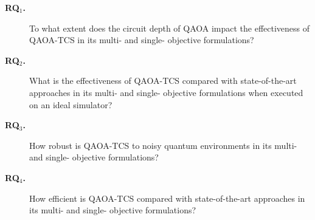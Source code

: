 \begin{description}
    \item[\textbf{RQ$_1$.}] To what extent does the circuit depth of QAOA impact the effectiveness of \textsc{QAOA-TCS} in its multi- and single- objective formulations?
    \item[\textbf{RQ$_2$.}] What is the effectiveness of \textsc{QAOA-TCS} compared with state-of-the-art approaches in its multi- and single- objective formulations when executed on an ideal simulator?
    \item[\textbf{RQ$_3$.}] How robust is QAOA-TCS to noisy quantum environments in its multi- and single- objective formulations?
    \item[\textbf{RQ$_4$.}] How efficient is \textsc{QAOA-TCS} compared with state-of-the-art approaches in its multi- and single- objective formulations?
\end{description}









